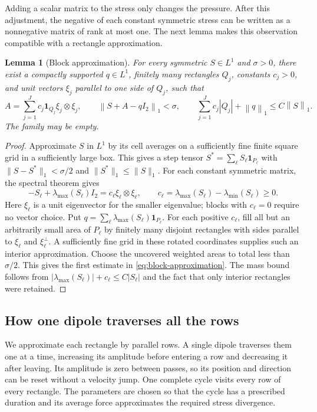 \documentclass[11pt,a4paper,reqno]{amsart}
\theoremstyle{plain}
\newtheorem{lemma}[theorem]{Lemma}
\theoremstyle{definition}
\theoremstyle{remark}
\numberwithin{equation}{section}
\newcommand{\norm}[2]{\left\|#1\right\|_{#2}}
\newcommand{\ind}{\mathbf 1}
\begin{document}
Adding a scalar matrix to the stress only changes the pressure.
After this adjustment, the negative of each constant symmetric stress
can be written as a nonnegative matrix of rank at most one. The next lemma makes
this observation compatible with a rectangle approximation.

\begin{lemma}[Block approximation]\label{lem:blocks}
For every symmetric $S\in L^1$ and $\sigma>0$, there exist a compactly
supported $q\in L^1$, finitely many rectangles $Q_j$, constants $c_j>0$,
and unit vectors $\xi_j$ parallel to one side of $Q_j$, such that
\begin{equation}\label{eq:block-approximation}
 A=\sum_{j=1}^Jc_j\ind_{Q_j}\xi_j\otimes\xi_j,
 \qquad\norm{S+A-qI_2}1<\sigma,
 \qquad \sum_{j=1}^Jc_j|Q_j|+\norm q1\le C\norm S1.
\end{equation}
The family may be empty.
\end{lemma}
\begin{proof}
Approximate $S$ in $L^1$ by its cell averages on a sufficiently fine
finite square grid in a sufficiently large box. This gives a
step tensor $S^*=\sum_\ell S_\ell\ind_{P_\ell}$ with
$\|S-S^*\|_1<\sigma/2$ and $\|S^*\|_1\le\|S\|_1$.
For each constant symmetric matrix, the spectral theorem gives
\[
 -S_\ell+\lambda_{\max}(S_\ell)I_2
   =c_\ell\xi_\ell\otimes\xi_\ell,
 \qquad c_\ell=\lambda_{\max}(S_\ell)
                         -\lambda_{\min}(S_\ell)\ge0.
\]
Here $\xi_\ell$ is a unit eigenvector for the smaller eigenvalue;
blocks with $c_\ell=0$ require no vector choice. Put
$q=\sum_\ell\lambda_{\max}(S_\ell)\ind_{P_\ell}$.
For each positive $c_\ell$, fill all but an arbitrarily small area of
$P_\ell$ by finitely many disjoint rectangles with sides parallel to
$\xi_\ell$ and $\xi_\ell^\perp$. A sufficiently fine grid in these
rotated coordinates supplies such an interior approximation. Choose
the uncovered weighted areas to total less than $\sigma/2$.
This gives the first estimate in \eqref{eq:block-approximation}.
The mass bound follows from
$|\lambda_{\max}(S_\ell)|+c_\ell\le C|S_\ell|$ and the fact that
only interior rectangles were retained.
\end{proof}

\subsection{How one dipole traverses all the rows}

We approximate each rectangle by parallel rows. A single dipole
traverses them one at a time, increasing its amplitude before entering
a row and decreasing it after leaving. Its amplitude is zero between
passes, so its position and direction can be reset without a velocity
jump. One complete cycle visits every row of every rectangle. The
parameters are chosen so that the cycle has a prescribed duration and
its average force approximates the required stress divergence.
\end{document}
